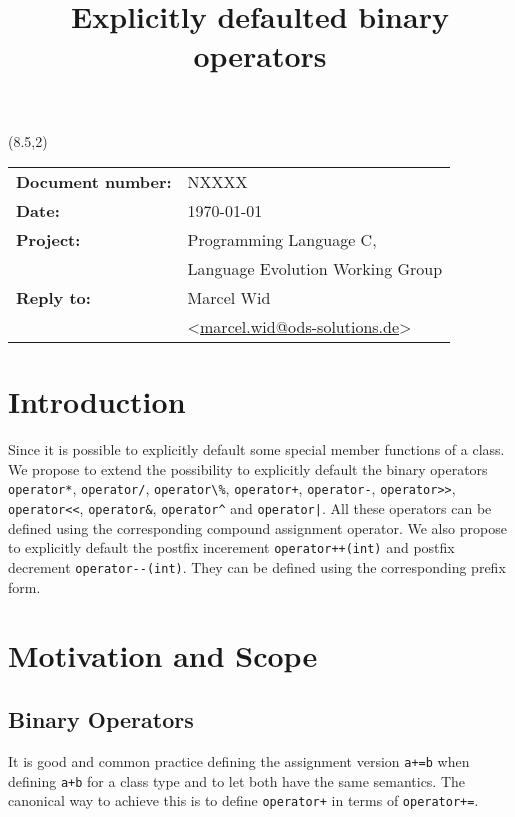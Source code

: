 \documentclass[a4paper,11pt,final]{article}
\title{Explicitly defaulted binary operators}
\author{}
\date{}
\newcommand{\tcode}[1]{\lstinline[basicstyle=\normalsize\ttfamily]{#1}}
\newcommand{\Rplus}{\protect\hspace{-.1em}\protect\raisebox{.1ex}{\small+}}
\newcommand{\Cpp}{\mbox{C\Rplus\Rplus}\xspace}
\numberwithin{equation}{subsection}
\begin{document}
\begin{textblock}{12}(8.5,2)
\begin{tabular}{l l}
\textbf{Document number:} & NXXXX\\
\textbf{Date:} & \today\\
\textbf{Project:} & Programming Language \Cpp,\\
& Language Evolution Working Group\\
\textbf{Reply to:} & Marcel Wid\\
& <\href{mailto:marcel.wid@ods-solutions.de}{marcel.wid@ods-solutions.de}>
\end{tabular}
\end{textblock}

\maketitle

\tableofcontents

\section{Introduction}
Since  it is possible to explicitly default some special member functions of a class. We propose to extend the possibility to explicitly default the binary operators \tcode{operator*}, \tcode{operator/}, \tcode{operator\%}, \tcode{operator+}, \tcode{operator-}, \tcode{operator>>}, \tcode{operator<<}, \tcode{operator&}, \tcode{operator^} and \tcode{operator|}. All these operators can be defined using the corresponding compound assignment operator. We also propose to explicitly default the postfix incerement \tcode{operator++(int)} and postfix decrement \tcode{operator--(int)}. They can be defined using the corresponding prefix form.

\section{Motivation and Scope}
\subsection{Binary Operators}
It is good and common practice defining the assignment version \tcode{a+=b} when defining \tcode{a+b} for a class type and to let both have the same semantics. The canonical way to achieve this is to define \tcode{operator+} in terms of \tcode{operator+=}.
\end{document}
